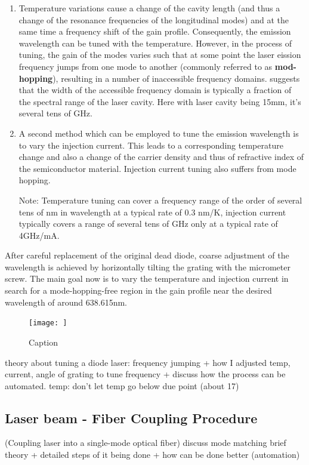 \documentclass[11pt,A4Paper]{article}
\begin{document}
\begin{enumerate}
    \item Temperature variations cause a change of the cavity length (and thus a change of the resonance frequencies of the longitudinal modes) and at the same time a frequency shift of the gain profile. Consequently, the emission wavelength can be tuned with the temperature. However, in the process of tuning, the gain of the modes varies such that at some point the laser eission frequency jumps from one mode to another (commonly referred to as \textbf{mod-hopping}), resulting in a number of inaccessible frequency domains. \cite{compactGratingDiodeLaser} suggests that the width of the accessible frequency domain is typically a fraction of the spectral range of the laser cavity. Here with laser cavity being 15mm, it's several tens of GHz.

    \item A second method which can be employed to tune the emission wavelength is to vary the injection current. This leads to a corresponding temperature change and also a change of the carrier density and thus of refractive index of the semiconductor material. Injection current tuning also suffers from mode hopping. 
    \par
    Note: Temperature tuning can cover a frequency range of the order of several tens of nm in wavelength at a typical rate of 0.3 nm/K, injection current typically covers a range of several tens of GHz only at a typical rate of 4GHz/mA. 
\end{enumerate}
 
After careful replacement of the original dead diode, coarse adjustment of the wavelength is achieved by horizontally tilting the grating with the micrometer screw. The main goal now is to vary the temperature and injection current in search for a mode-hopping-free region in the gain profile near the desired wavelength of around 638.615nm. 

\begin{figure}
    \centering
    \texttt{[image: ]}
    \caption{Caption}
    \label{fig:my_label}
\end{figure}


\cite{compactGratingDiodeLaser}theory about tuning a diode laser: frequency jumping + how I adjusted temp, current, angle of grating to tune frequency + discuss how the process can be automated.
temp: don't let temp go below due point (about 17) 


\subsection{Laser beam - Fiber Coupling Procedure}
(Coupling laser into a single-mode optical fiber) 
discuss mode matching
brief theory + detailed steps of it being done + how can be done better (automation) 
    
\end{document}

